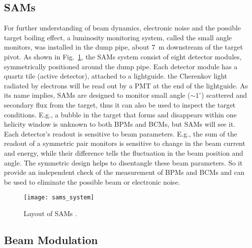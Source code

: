 \subsection{SAMs}
For further understanding of beam dynamics, electronic noise and the possible target 
boiling effect, a luminosity monitoring system, called the small angle monitors, 
was installed in the dump pipe, about 7~m downstream of the target pivot. As shown
in Fig.~\ref{fig:sams}, the SAMs system consist of eight detector modules, symmetrically 
positioned around the dump pipe. Each detector module has a quartz tile (active 
detector), attached to a lightguide. the Cherenkov light radiated by electrons	%
will be read out by a PMT at the end of the lightguide. 
As its name implies, SAMs are designed to monitor small angle ($\sim 1^\circ$)
scattered and secondary flux from the target, thus it can also be used to
inspect the target conditions. E.g., a bubble in the target that forms and disappears
within one helicity window is unknown to both BPMs and BCMs, but SAMs will see it.
Each detector's readout is sensitive to beam parameters.
E.g., the sum of the readout of a symmetric pair monitors is sensitive to change 
in the beam current and energy, while their difference tells the fluctuation in 
the beam position and angle.
The symmetric design helps to disentangle these beam parameters. So it provide
an independent check of the measurement of BPMs and BCMs and can be used to eliminate
the possible beam or electronic noise.
\begin{figure}[!h]
    \centering
    \texttt{[image: sams\_system]}
    \caption{Layout of SAMs \cite{Devi2021}.}
    \label{fig:sams}
\end{figure}

\subsection{Beam Modulation}
\begin{comment}
It is very important for PVES to control the systematic uncertainty, especially
the one from beam fluctuation (HCBA). Ideally, the electrons bunches with opposite
polarization should have exactly the same intensity and energy, hitting the target 
at the same place with the same angle, which is obviously impossible in reality. 
So we need to correct the false asymmetry introduce by the beam fluctuation. There are a
few methods to do the correction, one of them is the so called Beam modulation.
The idea is to introduce man-made fluctuations to the beam through the 
modulation system, then we can measure the changes in monitors and detectors 
to find the sensitivities of detectors to changes in energy, position and angle,
which will be used to correct the measured asymmetry.
\end{comment}

